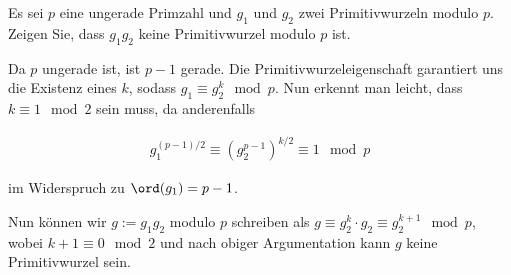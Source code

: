 
\begin{exercise}

Es sei $p$ eine ungerade Primzahl und $g_1$ und $g_2$ zwei Primitivwurzeln
modulo $p$. Zeigen Sie, dass $g_1g_2$ keine Primitivwurzel modulo $p$ ist.

\end{exercise}


\begin{solution}

Da $p$ ungerade ist, ist $p - 1$ gerade. Die Primitivwurzeleigenschaft garantiert
uns die Existenz eines $k$, sodass $g_1 \equiv g_2^k \mod{p}$.
Nun erkennt man leicht, dass $k \equiv 1 \mod{2}$ sein muss, da anderenfalls

\begin{align*}
    g_1^{(p-1)/2} \equiv \left(g_2^{p-1}\right)^{k/2} \equiv 1 \mod{p}
\end{align*}

im Widerspruch zu $\ord(g_1) = p - 1$.

Nun können wir $g := g_1g_2$ modulo $p$ schreiben als 
$g \equiv g_2^k\cdot g_2 \equiv g_2^{k+1} \mod{p}$,
wobei $k+1 \equiv 0 \mod{2}$ und nach obiger Argumentation kann $g$ keine
Primitivwurzel sein.
\end{solution}


